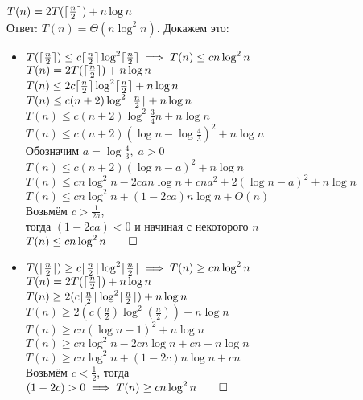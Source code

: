 \documentclass[12pt]{article}
\DeclarePairedDelimiter\ceil{\lceil}{\rceil}
\newcommand{\halfn}{\ceil{\frac{n}{2}}}
\newcommand{\Thalfn}{T(\halfn)}
\newcommand{\nlogn}[1][n]{#1 \log #1}
\newcommand{\nslogn}[1][n]{#1 \log^2 #1}
\begin{document}
	\large
	\noindent
	$T(n) = 2\Thalfn + n \log n$\\
	Ответ: $T(n) = \Theta(\nslogn)$. Докажем это:
	\begin{itemize}
		\item
			$\Thalfn \le c\nslogn[\halfn] \implies T(n) \le c\nslogn$\\
			$T(n) =  2\Thalfn + \nlogn$\\
			$T(n) \le 2c\nslogn[\halfn] + \nlogn$\\
			$T(n) \le c(n + 2)\log^2{\halfn} + \nlogn$\\
			$T(n) \le c(n + 2)\log^2{\frac{3}{4}n} + \nlogn$\\
			$T(n) \le c(n + 2)(\log n - \log\frac{4}{3})^2 + \nlogn$\\
			Обозначим $a = \log\frac{4}{3},\; a > 0$\\
			$T(n) \le c(n + 2)(\log n - a)^2 + \nlogn$\\
			$T(n) \le c\nslogn - 2ca\nlogn + cna^2 + 2(\log n - a)^2 + \nlogn$\\
			$T(n) \le c\nslogn + (1 - 2ca)\nlogn + O(n)$\\
			Возьмём $c > \frac{1}{2a}$,\\
			тогда $(1 - 2ca) < 0$ и начиная с некоторого $n$\\
			$T(n) \le c\nslogn \qed$
		\item
			$\Thalfn \ge c\nslogn[\halfn] \implies T(n) \ge c\nslogn$\\
			$T(n) = 2\Thalfn + \nlogn$\\
			$T(n) \ge 2(c\nslogn[\halfn]) + \nlogn$\\
			$T(n) \ge 2(c\nslogn[(\frac{n}{2})]) + \nlogn$\\
			$T(n) \ge cn(\log n - 1)^2 + \nlogn$\\
			$T(n) \ge c\nslogn - 2c\nlogn + cn + \nlogn$\\
			$T(n) \ge c\nslogn + (1 - 2c)\nlogn + cn$\\
			Возьмём $c < \frac{1}{2}$, тогда\\
			$(1 - 2c) > 0 \implies T(n) \ge c\nslogn \qed$
	\end{itemize}
\end{document}
